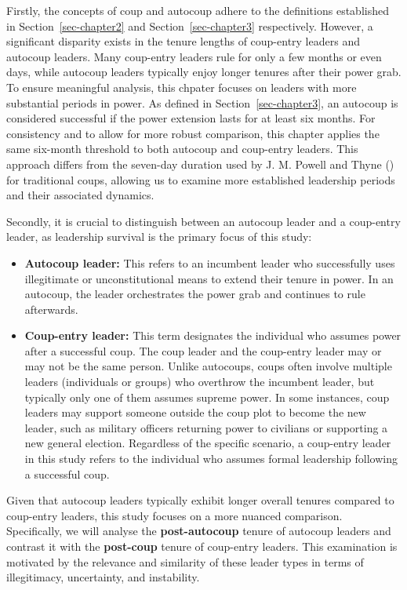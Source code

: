 \documentclass[
  12pt,
]{report}
\begin{document}
Firstly, the concepts of coup and autocoup adhere to the definitions
established in Section~\ref{sec-chapter2} and Section~\ref{sec-chapter3}
respectively. However, a significant disparity exists in the tenure
lengths of coup-entry leaders and autocoup leaders. Many coup-entry
leaders rule for only a few months or even days, while autocoup leaders
typically enjoy longer tenures after their power grab. To ensure
meaningful analysis, this chpater focuses on leaders with more
substantial periods in power. As defined in Section~\ref{sec-chapter3},
an autocoup is considered successful if the power extension lasts for at
least six months. For consistency and to allow for more robust
comparison, this chapter applies the same six-month threshold to both
autocoup and coup-entry leaders. This approach differs from the
seven-day duration used by J. M. Powell and Thyne
() for traditional coups, allowing us to
examine more established leadership periods and their associated
dynamics.

Secondly, it is crucial to distinguish between an autocoup leader and a
coup-entry leader, as leadership survival is the primary focus of this
study:

\begin{itemize}
\item
  \textbf{Autocoup leader:} This refers to an incumbent leader who
  successfully uses illegitimate or unconstitutional means to extend
  their tenure in power. In an autocoup, the leader orchestrates the
  power grab and continues to rule afterwards.
\item
  \textbf{Coup-entry leader:} This term designates the individual who
  assumes power after a successful coup. The coup leader and the
  coup-entry leader may or may not be the same person. Unlike autocoups,
  coups often involve multiple leaders (individuals or groups) who
  overthrow the incumbent leader, but typically only one of them assumes
  supreme power. In some instances, coup leaders may support someone
  outside the coup plot to become the new leader, such as military
  officers returning power to civilians or supporting a new general
  election. Regardless of the specific scenario, a coup-entry leader in
  this study refers to the individual who assumes formal leadership
  following a successful coup.
\end{itemize}

Given that autocoup leaders typically exhibit longer overall tenures
compared to coup-entry leaders, this study focuses on a more nuanced
comparison. Specifically, we will analyse the \textbf{post-autocoup}
tenure of autocoup leaders and contrast it with the \textbf{post-coup}
tenure of coup-entry leaders. This examination is motivated by the
relevance and similarity of these leader types in terms of illegitimacy,
uncertainty, and instability.
\end{document}
